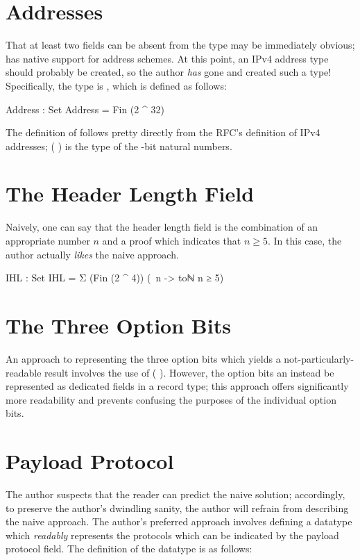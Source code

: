 \documentclass{report}
\begin{document}
\section{Addresses}
That at least two fields can be absent from the  type may be immediately obvious;  has native support for address schemes.  At this point, an IPv4 address type should probably be created, so the author \emph{has} gone and created such a type!  Specifically, the type is , which is defined as follows:

\begin{code}
  Address : Set
  Address = Fin (2 ^ 32)
\end{code}

The definition of  follows pretty directly from the RFC's definition of IPv4 addresses;  \AgdaSymbol( \AgdaOperator{\AgdaFunction{^}} \AgdaSymbol) is the type of the -bit natural numbers.

\section{The Header Length Field}
Naively, one can say that the header length field is the combination of an appropriate  number \(n\) and a proof which indicates that \(n \geq 5\).  In this case, the author actually \emph{likes} the naive approach.

\begin{code}
  IHL : Set
  IHL = Σ (Fin (2 ^ 4)) (\ n -> toℕ n ≥ 5)
\end{code}

\section{The Three Option Bits}
An approach to representing the three option bits which yields a not-particularly-readable result involves the use of  \AgdaSymbol( \AgdaOperator{\AgdaFunction{\circumflex}} \AgdaSymbol).  However, the option bits an instead be represented as dedicated  fields in a record type; this approach offers significantly more readability and prevents confusing the purposes of the individual option bits.

\section{Payload Protocol}
The author suspects that the reader can predict the naive solution; accordingly, to preserve the author's dwindling sanity, the author will refrain from describing the naive approach.  The author's preferred approach involves defining a datatype which \emph{readably} represents the protocols which can be indicated by the payload protocol field.  The definition of the datatype is as follows:
\end{document}
